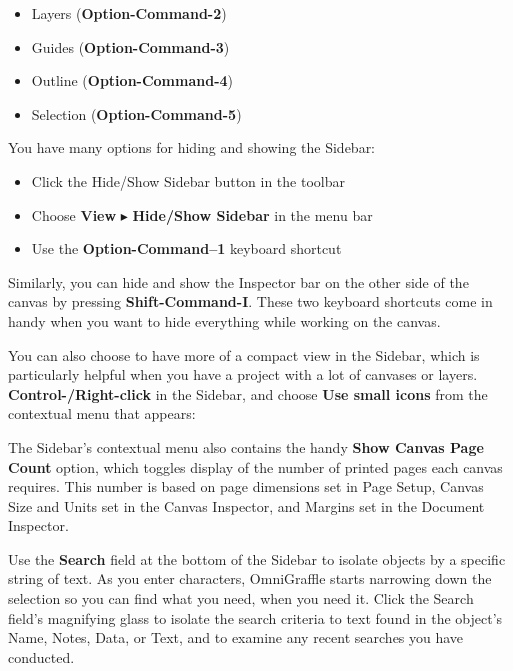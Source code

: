 \documentclass[../main.tex]{subfiles}
\begin{document}
\begin{itemize}
  \item Layers (\textbf{Option-Command-2})
  \item Guides (\textbf{Option-Command-3})
  \item Outline (\textbf{Option-Command-4})
  \item Selection (\textbf{Option-Command-5})
\end{itemize}

You have many options for hiding and showing the Sidebar:

\begin{itemize}
  \item Click the Hide/Show Sidebar button in the toolbar
  \item Choose \textbf{View} $\blacktriangleright$ \textbf{Hide/Show Sidebar} in the menu bar
  \item Use the \textbf{Option-Command--1} keyboard shortcut
\end{itemize}

\begin{ogtip}
  Similarly, you can hide and show the Inspector bar on the other side of the canvas by pressing
  \textbf{Shift-Command-I}. These two keyboard shortcuts come in handy when you want to hide
  everything while working on the canvas.
\end{ogtip}

You can also choose to have more of a compact view in the Sidebar, which is particularly helpful
when you have a project with a lot of canvases or layers. \textbf{Control-/Right-click} in the
Sidebar, and choose \textbf{Use small icons} from the contextual menu that appears:


\begin{ognote}
  The Sidebar's contextual menu also contains the handy \textbf{Show Canvas Page Count} option,
  which toggles display of the number of printed pages each canvas requires. This number is
  based on page dimensions set in Page Setup, Canvas Size and Units set in the Canvas Inspector,
  and Margins set in the Document Inspector.
\end{ognote}

Use the \textbf{Search} field at the bottom of the Sidebar to isolate objects by a specific
string of text. As you enter characters, OmniGraffle starts narrowing down the selection so
you can find what you need, when you need it. Click the Search field's magnifying glass to
isolate the search criteria to text found in the object's Name, Notes, Data, or Text, and to
examine any recent searches you have conducted.
\end{document}
